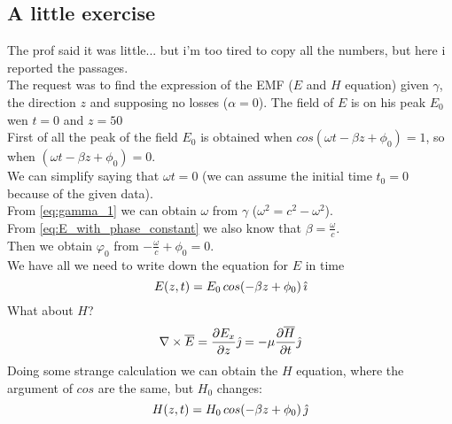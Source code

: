 \subsection*{A little exercise}
The prof said it was little... but i'm too tired to copy all the numbers, but here i reported the passages.\\
 The request was to find the expression of the EMF ($E$ and $H$ equation) given $\gamma $, the direction $z$ and supposing no losses ($\alpha=0$). The field of $E$ is on his peak $E_0$ wen $t=0$ and $z=50$\\
 First of all the peak of the field $E_0$ is obtained when $cos(\omega t-\beta z +\phi_0)=1$, so when $(\omega t-\beta z +\phi_0)=0$.\\
 We can simplify saying that $\omega t =0$ (we can assume the initial time $t_0=0$ because of the given data).\\
 From \cref{eq:gamma_1} we can obtain $\omega$ from $\gamma$ ($\omega^2=c^2-\omega^2$).\\
 From \cref{eq:E_with_phase_constant} we also know that $\beta=\frac{\omega}{c}$.\\
Then we obtain $\varphi_0$ from $-\frac{\omega}{c}+\phi_0=0$.\\
We have all we need to write down the equation for $E$ in time
\begin{equation*}
    E(z,t)=E_0\, cos(-\beta z +\phi_0)\,\hat{\imath}
\end{equation*}
What about $H$?
\begin{equation}
    \nabla\times \overline{E}=\frac{\partial E_x}{\partial z}\hat{\jmath}=-\mu\frac{\partial \overline{H}}{\partial t}\hat{\jmath}
\end{equation}
Doing some strange calculation we can obtain the $H$ equation, where the argument of $cos$ are the same, but $H_0$ changes:
\begin{equation*}
    H(z,t)=H_0\, cos(-\beta z +\phi_0)\,\hat{\jmath}
\end{equation*}
